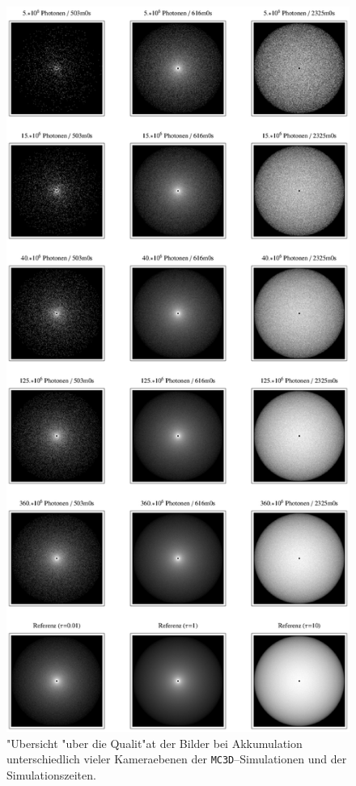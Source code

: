 		\begin{figure}
			\centering
			\includegraphics[height=1.0\textheight]{mc3dsphereimageoverview.eps}
			\caption{"Ubersicht "uber die Qualit"at der Bilder bei Akkumulation unterschiedlich vieler Kameraebenen der \texttt{MC3D}--Simulationen und der Simulationszeiten.}
			\label{fig:mc3d_sphere_imageoverview}
		\end{figure}
